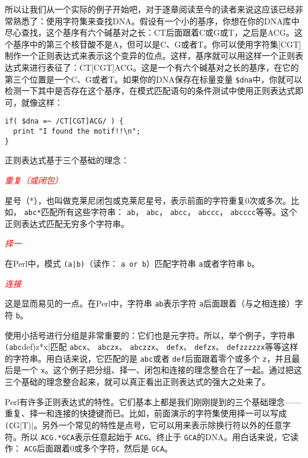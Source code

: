 所以让我们从一个实际的例子开始吧，对于逐章阅读至今的读者来说这应该已经非常熟悉了：使用字符集来查找DNA。假设有一个小的基序，你想在你的DNA库中尽心查找，这个基序有六个碱基对之长：CT后面跟着C或G或T，之后是ACG。这个基序中的第三个核苷酸不是A，但可以是C、G或者T。你可以使用字符集[CGT]制作一个正则表达式来表示这个变异的位点。这样，基序就可以用这样一个正则表达式来进行表征了：CT[CGT]ACG。这是一个有六个碱基对之长的基序，在它的第三个位置是一个C、G或者T。如果你的DNA保存在标量变量 \verb|$dna|中，你就可以检测一下其中是否存在这个基序，在模式匹配语句的条件测试中使用正则表达式即可，就像这样：

\begin{lstlisting}
if( $dna =~ /CT[CGT]ACG/ ) {
  print "I found the motif!!\n";
}
\end{lstlisting}

正则表达式基于三个基础的理念：

\textcolor{red}{\textit{重复（或闭包）}}
\begin{adjustwidth}{4em}{}
\hspace*{2em}星号（*），也叫做克莱尼闭包或克莱尼星号，表示前面的字符重复0次或多次。比如， \verb|abc*|匹配所有这些字符串： \verb|ab|， \verb|abc|， \verb|abcc|， \verb|abccc|， \verb|abcccc|等等。这个正则表达式匹配无穷多个字符串。
\end{adjustwidth}

\textcolor{red}{\textit{择一}}
\begin{adjustwidth}{4em}{}
\hspace*{2em}在Perl中，模式 \verb=(a|b)=（读作： \verb|a or b|）匹配字符串 \verb|a|或者字符串 \verb|b|。
\end{adjustwidth}

\textcolor{red}{\textit{连接}}
\begin{adjustwidth}{4em}{}
\hspace*{2em}这是显而易见的一点。在Perl中，字符串 \verb|ab|表示字符 \verb|a|后面跟着（与之相连接）字符 \verb|b|。
\end{adjustwidth}

使用小括号进行分组是非常重要的：它们也是元字符。所以，举个例子，字符串 \verb|(abc|def)z*x|匹配 \verb|abcx|、 \verb|abczx|、 \verb|abczzx|、 \verb|defx|、 \verb|defzx|、 \verb|defzzzzzx|等等这样的字符串。用白话来说，它匹配的是 \verb|abc|或者 \verb|def|后面跟着零个或多个 \verb|z|，并且最后是一个 \verb|x|。这个例子把分组、择一、闭包和连接的理念整合在了一起。通过把这三个基础的理念整合起来，就可以真正看出正则表达式的强大之处来了。

Perl有许多正则表达式的特性。它们基本上都是我们刚刚提到的三个基础理念——重复、择一和连接的快捷键而已。比如，前面演示的字符集使用择一可以写成 \verb|(C|G|T)|。另外一个常见的特性是点号，它可以用来表示除换行符以外的任意字符。所以 \verb|ACG.*GCA|表示任意起始于 \verb|ACG|、终止于 \verb|GCA|的DNA。用白话来说，它读作： \verb|ACG|后面跟着0或多个字符，然后是 \verb|GCA|。

